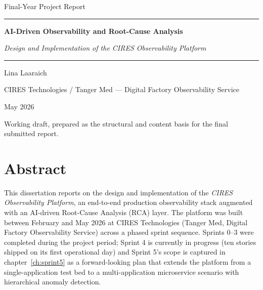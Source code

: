 \documentclass[11pt,a4paper,oneside]{report}
\newcommand{\reporttitle}{AI-Driven Observability and Root-Cause Analysis}
\newcommand{\reportsubtitle}{Design and Implementation of the CIRES Observability Platform}
\newcommand{\reportauthor}{Lina Laaraich}
\newcommand{\reportorg}{CIRES Technologies / Tanger Med --- Digital Factory Observability Service}
\newcommand{\reportdate}{May 2026}
\begin{document}
\begin{titlepage}
\centering
\vspace*{2.5cm}
{\fontsize{12}{14}\selectfont Final-Year Project Report \par}
\vspace{0.6cm}
{\color{accentdark}\rule{0.55\textwidth}{0.6pt}\par}
\vspace{1.0cm}
{\fontsize{24}{30}\selectfont\bfseries \reporttitle \par}
\vspace{0.6cm}
{\fontsize{16}{20}\selectfont\itshape \reportsubtitle \par}
\vspace{0.8cm}
{\color{accentdark}\rule{0.55\textwidth}{0.6pt}\par}
\vspace{2.2cm}
{\large \reportauthor \par}
\vspace{0.4cm}
{\normalsize \reportorg \par}
\vfill
{\large \reportdate \par}
\vspace{0.6cm}
{\small Working draft, prepared as the structural and content basis for the final submitted report.}
\end{titlepage}

\chapter*{Abstract}

This dissertation reports on the design and implementation of the
\emph{CIRES Observability Platform}, an end-to-end production
observability stack augmented with an AI-driven Root-Cause Analysis
(RCA) layer.  The platform was built between February and May 2026 at
CIRES Technologies (Tanger Med, Digital Factory Observability Service)
across a phased sprint sequence.  Sprints 0--3 were completed during
the project period; Sprint 4 is currently in progress (ten stories
shipped on its first operational day) and Sprint 5's scope is
captured in chapter~\ref{ch:sprint5} as a forward-looking plan that
extends the platform from a single-application test bed to a
multi-application microservice scenario with hierarchical anomaly
detection.
\end{document}
